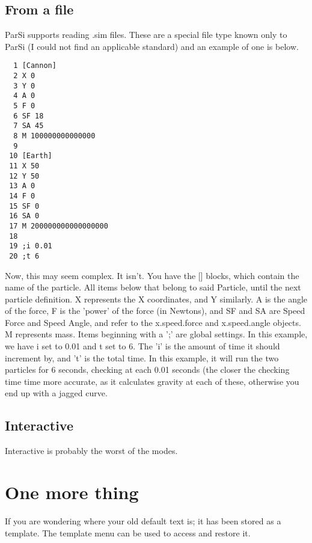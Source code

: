 \documentclass[11pt]{article}
\begin{document}
\subsection {From a file}
ParSi supports reading .sim files. These are a special file type known only to ParSi (I could not find an applicable standard) and an example of one is below.
\begin {lstlisting}
  1 [Cannon]
  2 X 0
  3 Y 0
  4 A 0
  5 F 0
  6 SF 18
  7 SA 45
  8 M 100000000000000
  9 
 10 [Earth]
 11 X 50
 12 Y 50
 13 A 0
 14 F 0
 15 SF 0
 16 SA 0
 17 M 200000000000000000
 18 
 19 ;i 0.01
 20 ;t 6
\end{lstlisting}
Now, this may seem complex. It isn't. You have the [] blocks, which contain the name of the particle. All items below that belong to said Particle, until the next particle definition.\newline
X represents the X coordinates, and Y similarly. A is the angle of the force, F is the 'power' of the force (in Newtons), and SF and SA are Speed Force and Speed Angle, and refer to the x.speed.force and x.speed.angle objects. M represents mass.\newline
Items beginning with a ';' are global settings. In this example, we have i set to 0.01 and t set to 6. The 'i' is the amount of time it should increment by, and 't' is the total time. In this example, it will run the two particles for 6 seconds, checking at each 0.01 seconds (the closer the checking time time more accurate, as it calculates gravity at each of these, otherwise you end up with a jagged curve.

\subsection {Interactive}
Interactive is probably the worst of the modes.

\section{One more thing}
If you are wondering where your old default text is; it has been stored as a template. The template menu can be used to access and restore it. 
\end{document}
